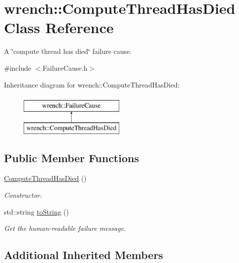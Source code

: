 \hypertarget{classwrench_1_1_compute_thread_has_died}{}\section{wrench\+:\+:Compute\+Thread\+Has\+Died Class Reference}
\label{classwrench_1_1_compute_thread_has_died}


A \char`\"{}compute thread has died\char`\"{} failure cause.  




{\ttfamily \#include $<$Failure\+Cause.\+h$>$}

Inheritance diagram for wrench\+:\+:Compute\+Thread\+Has\+Died\+:\begin{figure}[H]
\begin{center}
\leavevmode
\includegraphics[height=2.000000cm]{classwrench_1_1_compute_thread_has_died}
\end{center}
\end{figure}
\subsection*{Public Member Functions}
\begin{DoxyCompactItemize}
\item 
\mbox{\label{classwrench_1_1_compute_thread_has_died_aae50c72393efaaad0d409ca552142e98}} 
\hyperlink{classwrench_1_1_compute_thread_has_died_aae50c72393efaaad0d409ca552142e98}{Compute\+Thread\+Has\+Died} ()
\begin{DoxyCompactList}\small\item\em Constructor. \end{DoxyCompactList}\item 
std\+::string \hyperlink{classwrench_1_1_compute_thread_has_died_a4725416d9ff31b39ec9d48d23d1c1c0b}{to\+String} ()
\begin{DoxyCompactList}\small\item\em Get the human-\/readable failure message. \end{DoxyCompactList}\end{DoxyCompactItemize}
\subsection*{Additional Inherited Members}


